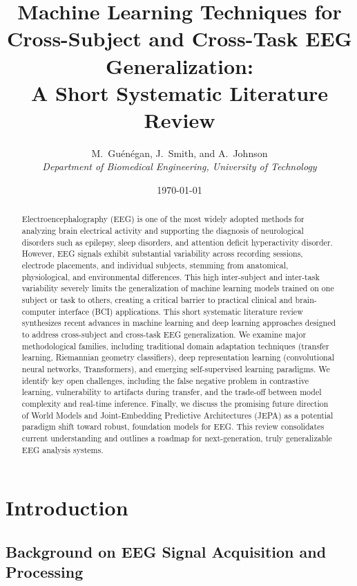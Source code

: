 \documentclass[11pt]{article}
\title{Machine Learning Techniques for Cross-Subject and Cross-Task EEG Generalization: \\
A Short Systematic Literature Review}
\author{M.~Guénégan, J.~Smith, and A.~Johnson \\
\textit{Department of Biomedical Engineering, University of Technology}}
\date{\today}
\begin{document}
\maketitle


\begin{abstract}
Electroencephalography (EEG) is one of the most widely adopted methods for analyzing brain electrical activity and supporting the diagnosis of neurological disorders such as epilepsy, sleep disorders, and attention deficit hyperactivity disorder. However, EEG signals exhibit substantial variability across recording sessions, electrode placements, and individual subjects, stemming from anatomical, physiological, and environmental differences. This high inter-subject and inter-task variability severely limits the generalization of machine learning models trained on one subject or task to others, creating a critical barrier to practical clinical and brain-computer interface (BCI) applications. This short systematic literature review synthesizes recent advances in machine learning and deep learning approaches designed to address cross-subject and cross-task EEG generalization. We examine major methodological families, including traditional domain adaptation techniques (transfer learning, Riemannian geometry classifiers), deep representation learning (convolutional neural networks, Transformers), and emerging self-supervised learning paradigms. We identify key open challenges, including the false negative problem in contrastive learning, vulnerability to artifacts during transfer, and the trade-off between model complexity and real-time inference. Finally, we discuss the promising future direction of World Models and Joint-Embedding Predictive Architectures (JEPA) as a potential paradigm shift toward robust, foundation models for EEG. This review consolidates current understanding and outlines a roadmap for next-generation, truly generalizable EEG analysis systems.
\end{abstract}

\section{Introduction}\label{sec:intro}

\subsection{Background on EEG Signal Acquisition and Processing}
\end{document}
